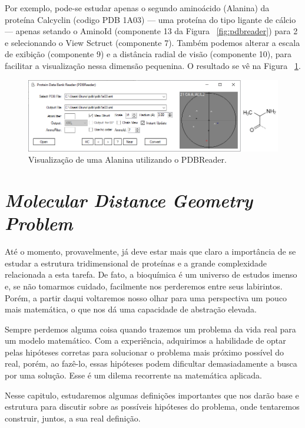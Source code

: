 \documentclass[a4paper,12pt]{article}
\begin{document}
	Por exemplo, pode-se estudar apenas o segundo aminoácido (Alanina) da proteína Calcyclin (codigo PDB 1A03) --- uma proteína do tipo ligante de cálcio --- apenas setando o AminoId (componente 13 da Figura ~\ref{fig:pdbreader}) para 2 e selecionando o View Sctruct (componente 7). Também podemos alterar a escala de exibição (componente 9) e a distância radial de visão (componente 10), para facilitar a visualização nessa dimensão pequenina. O resultado se vê na Figura ~\ref{fig:exemploView}.
	
	\begin{figure}[H]
		\hspace{-1.3cm}
		\includegraphics[width=1.2\linewidth]{exemploView.png}
		\caption{Visualização de uma Alanina utilizando o PDBReader.}
		\label{fig:exemploView}
	\end{figure}
	
	\newpage
	\section{\textit{Molecular Distance Geometry Problem}}
	Até o momento, provavelmente, já deve estar mais que claro a importância de se estudar a estrutura tridimensional de proteínas e a grande complexidade relacionada a esta tarefa. De fato, a bioquímica é um universo de estudos imenso e, se não tomarmos cuidado, facilmente nos perderemos entre seus labirintos. Porém, a partir daqui voltaremos nosso olhar para uma perspectiva um pouco mais matemática, o que nos dá uma capacidade de abstração elevada.
	
	Sempre perdemos alguma coisa quando trazemos um problema da vida real para um modelo matemático. Com a experiência, adquirimos a habilidade de optar pelas hipóteses corretas para solucionar o problema mais próximo possível do real, porém, ao fazê-lo, essas hipóteses podem dificultar demasiadamente a busca por uma solução. Esse é um dilema recorrente na matemática aplicada.
	 
	Nesse capitulo, estudaremos algumas definições importantes que nos darão base e estrutura para discutir sobre as possíveis hipóteses do problema, onde tentaremos construir, juntos, a sua real definição.  
	
\end{document}
